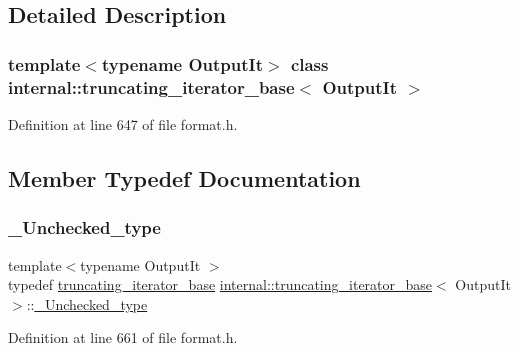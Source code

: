 \subsection{Detailed Description}
\subsubsection*{template$<$typename Output\+It$>$\newline
class internal\+::truncating\+\_\+iterator\+\_\+base$<$ Output\+It $>$}



Definition at line 647 of file format.\+h.



\subsection{Member Typedef Documentation}
\mbox{\label{classinternal_1_1truncating__iterator__base_a86f622767ff73e08480a19d3b4edde90}} 
\subsubsection{\texorpdfstring{\+\_\+\+Unchecked\+\_\+type}{\_Unchecked\_type}}
{\footnotesize\ttfamily template$<$typename Output\+It $>$ \\
typedef \hyperlink{classinternal_1_1truncating__iterator__base}{truncating\+\_\+iterator\+\_\+base} \hyperlink{classinternal_1_1truncating__iterator__base}{internal\+::truncating\+\_\+iterator\+\_\+base}$<$ Output\+It $>$\+::\hyperlink{classinternal_1_1truncating__iterator__base_a86f622767ff73e08480a19d3b4edde90}{\+\_\+\+Unchecked\+\_\+type}}



Definition at line 661 of file format.\+h.

\mbox{\label{classinternal_1_1truncating__iterator__base_a1de427247bb2d6ff61298ce48f5fec8d}} 

